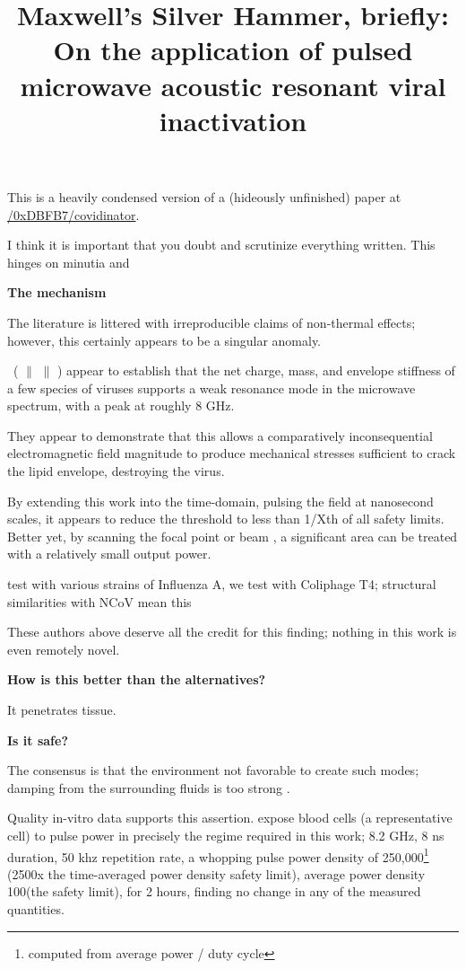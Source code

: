 \documentclass[fleqn,10pt]{paper}
\title{Maxwell's Silver Hammer, briefly:\\ On the application of pulsed microwave acoustic resonant viral inactivation}
\begin{document}
\maketitle


This is a heavily condensed version of a (hideously unfinished) paper at \href{https://www.github.com/0xDBFB7/covidinator/documents/paper.pdf}{\faGithub/0xDBFB7/covidinator}.

I think it is important that you doubt and scrutinize everything written. This hinges on minutia and 

{\Large \textbf{The mechanism}}

The literature is littered with irreproducible claims of non-thermal effects; however, this certainly appears to be a singular anomaly.

\cite{Microwave2009} \textrightarrow \ (\cite{focusing2014} $\parallel$ \cite{Efficient2015} $\parallel$ \cite{Resonant2017}) appear to establish that the net charge, mass, and envelope stiffness of a few species of viruses supports a weak resonance mode in the microwave spectrum, with a peak at roughly 8 GHz.

They appear to demonstrate that this allows a comparatively inconsequential electromagnetic field magnitude to produce mechanical stresses sufficient to crack the lipid envelope, destroying the virus.

By extending this work into the time-domain, pulsing the field at nanosecond scales, it appears to reduce the threshold to less than 1/Xth of all safety limits. Better yet, by scanning the focal point or beam , a significant area can be treated with a relatively small output power.

\cite{Efficient2015} test with various strains of Influenza A, we test with Coliphage T4; structural similarities with NCoV mean this



These authors above deserve all the credit for this finding; nothing in this work is even remotely novel.

{\Large \textbf{How is this better than the alternatives?}}

It penetrates tissue.

{\Large \textbf{Is it safe?}}

The consensus is that the environment not favorable to create such modes; damping from the surrounding fluids is too strong \cite{Vibrational2002}. 

Quality in-vitro data supports this assertion. \cite{Cytogenetic2006} expose blood cells (a representative cell) to pulse power in precisely the regime required in this work; 8.2 GHz, 8 ns duration, 50 khz repetition rate, a whopping pulse power density of 250,000\Wsqm\footnote{computed from average power / duty cycle} (2500x the time-averaged power density safety limit), average power density 100\Wsqm (the safety limit), for 2 hours, finding no change in any of the measured quantities. 
\end{document}
